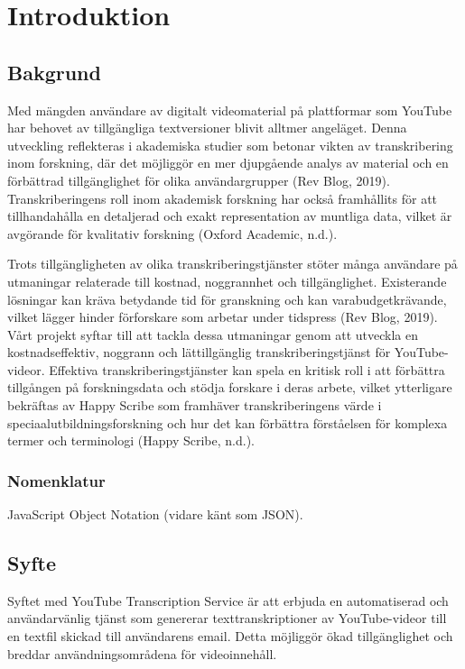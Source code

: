 \chapter{Introduktion}

\section{Bakgrund}
Med mängden användare av digitalt videomaterial på plattformar som YouTube har behovet av tillgängliga textversioner blivit alltmer angeläget. Denna utveckling reflekteras i akademiska studier som betonar vikten av transkribering inom forskning, där det möjliggör en mer djupgående analys av material och en förbättrad tillgänglighet för olika användargrupper (Rev Blog, 2019). Transkriberingens roll inom akademisk forskning har också framhållits för att tillhandahålla en detaljerad och exakt representation av muntliga data, vilket är avgörande för kvalitativ forskning (Oxford Academic, n.d.).

Trots tillgängligheten av olika transkriberingstjänster stöter många användare på utmaningar relaterade till kostnad, noggrannhet och tillgänglighet. Existerande lösningar kan kräva betydande tid för granskning och kan varabudgetkrävande, vilket lägger hinder förforskare som arbetar under tidspress (Rev Blog, 2019). Vårt projekt syftar till att tackla dessa utmaningar genom att utveckla en kostnadseffektiv, noggrann och lättillgänglig transkriberingstjänst för YouTube-videor. Effektiva transkriberingstjänster kan spela en kritisk roll i att förbättra tillgången på forskningsdata och stödja forskare i deras arbete, vilket ytterligare bekräftas av Happy Scribe som framhäver transkriberingens värde i speciaalutbildningsforskning och hur det kan förbättra förståelsen för komplexa termer och terminologi (Happy Scribe, n.d.).

\subsection{Nomenklatur}
JavaScript Object Notation (vidare känt som JSON).

\section{Syfte}
Syftet med YouTube Transcription Service är att erbjuda en automatiserad och användarvänlig tjänst som genererar texttranskriptioner av YouTube-videor till en textfil skickad till användarens email. Detta möjliggör ökad tillgänglighet och breddar användningsområdena för videoinnehåll.

